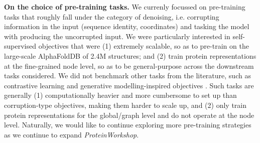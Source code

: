 \textbf{On the choice of pre-training tasks. }
We currenly focussed on pre-training tasks that roughly fall under the category of denoising, i.e. corrupting information in the input (sequence identity, coordinates) and tasking the model with producing the uncorrupted input. 
We were particularly interested in self-supervised objectives that were (1) extremely scalable, so as to pre-train on the large-scale AlphaFoldDB of 2.4M structures; and (2) train protein representations at the fine-grained node level, so as to be general-purpose across the downstream tasks considered.
We did not benchmark other tasks from the literature, such as contrastive learning and generative modelling-inspired objectives \citep{liu2023molecular, liu2023symmetry, zhang2023enhancing}. 
Such tasks are generally (1) computationally heavier and more cumbersome to set up than corruption-type objectives, making them harder to scale up, and (2) only train protein representations for the global/graph level and do not operate at the node level.
Naturally, we would like to continue exploring more pre-training strategies as we continue to expand \emph{ProteinWorkshop}.


